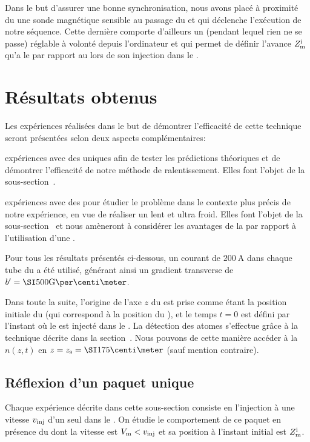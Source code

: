 Dans le but d'assurer une bonne synchronisation, nous avons placé à proximité du \conv une sonde magnétique sensible au passage du \mimo et qui déclenche l'exécution de notre séquence. Cette dernière comporte d'ailleurs un (pendant lequel rien ne se passe) réglable à volonté depuis l'ordinateur et qui permet de définir l'avance $Z_{\mathrm {m}}^{\mathrm i}$ qu'a le \mimo par rapport au \pat lors de son injection dans le \gm. 




\section{Résultats obtenus}\label{sec:Resultats}
Les expériences réalisées dans le but de démontrer l'efficacité de cette technique seront présentées selon deux aspects complémentaires:
\begin{itemizel}
	\item expériences avec des \pats uniques afin de tester les prédictions théoriques et de démontrer l'efficacité de notre méthode de ralentissement. Elles font l'objet de la sous-section~.
	\item expériences avec des \patss pour étudier le problème dans le contexte plus précis de notre expérience, \cad en vue de réaliser un \jatgm lent et ultra froid. Elles font l'objet de la sous-section~ et nous amèneront à considérer les avantages de la \techmimo par rapport à l'utilisation d'une \secpent.
\end{itemizel}
Pour tous les résultats présentés ci-dessous, un courant de $\SI{200}{\ampere}$ dans chaque tube du \gm a été utilisé, générant ainsi un gradient transverse de \chm $b'=\gausspcm{500}$. 

Dans toute la suite, l'origine de l'axe $z$ du \gm est prise comme étant la position initiale du \pat (qui correspond à la position du \pmo), et le temps $t=0$ est défini par l'instant où le \pat est injecté dans le \gm. 
La détection des atomes s'effectue grâce à la technique décrite dans la section~. Nous pouvons de cette manière accéder à la \datlin $n(z,t)$ en $z = \zsonde = \cm{175}$ (sauf mention contraire). 

\subsection{Réflexion d'un paquet unique} \label{sec:ResultatPaquetUnique}
Chaque expérience décrite dans cette sous-section consiste en l'injection à une vitesse $v_{{\rm {inj}}}$ d'un seul \pat dans le \gm. On étudie le comportement de ce paquet en présence du \mimo dont la vitesse est $V_{\rm {m}} < v_{{\rm {inj}}}$ et sa position à l'instant initial est $Z_{\mathrm {m}}^{\mathrm i}$.

